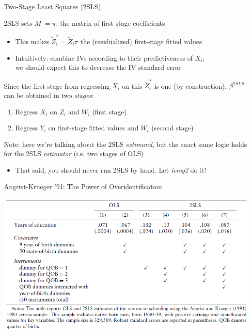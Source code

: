 \documentclass{beamer}
\begin{document}
\begin{frame}{Two-Stage Least Squares (2SLS)}

2SLS sets $M^\prime=\pi$: the matrix of first-stage coefficients
\begin{itemize}
\item This makes $\tilde{Z}_i^*=\tilde{Z}_i^\prime\pi$ the (residualized) first-stage fitted values 
\item Intuitively: combine IVs according to their predictiveness of $X_i$; \\ we should expect this to decrease the IV standard error
\end{itemize}\bigskip\pause{}
Since the first-stage from regressing $X_i$ on this $\tilde{Z}_i^*$ is one (by construction), $\beta^{2SLS}$ can be obtained in two \emph{stages}:
\begin{enumerate}
\item Regress $X_i$ on $Z_i$ and $W_i$ (first stage)
\item Regress $Y_i$ on first-stage fitted values and $W_i$ (second stage)
\end{enumerate}\bigskip\pause{}
Note: here we're talking about the 2SLS \emph{estimand}, but the exact same logic holds for the 2SLS \emph{estimator} (i.e. two stages of OLS)
\begin{itemize}
\item That said, you should never run 2SLS by hand. Let \emph{ivreg2} do it!
\end{itemize}
\end{frame}

\begin{frame}{Angrist-Krueger '91: The Power of Overidentification}

\includegraphics[scale=0.5]{./lecture_includes/ak_table.png}


\end{frame}
\end{document}
